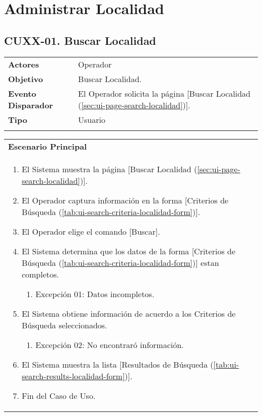 \clearpage
\section{Administrar Localidad} \label{sec:cf-uc-admin-localidad}

\subsection{CUXX-01. Buscar Localidad} \label{sec:cu-search-Localidad}

\begin{tabular}{ p{3.5cm} p{11.5cm} }
	\textbf{Actores} & Operador\\
	\textbf{Objetivo} & Buscar Localidad.\\
	\textbf{Evento Disparador} & El Operador solicita la página [Buscar Localidad (\ref{sec:ui-page-search-localidad})].\\
	\textbf{Tipo} & Usuario\\
	\\
\end{tabular}

\begin{tabular}{ p{15.5cm} }
	\textbf{Escenario Principal} \\
	\begin{enumerate}
		\item El Sistema muestra la página [Buscar Localidad (\ref{sec:ui-page-search-localidad})].
		\item El Operador captura información en la forma [Criterios de Búsqueda (\ref{tab:ui-search-criteria-localidad-form})].
		\item El Operador elige el comando [Buscar].
		\item El Sistema determina que los datos de la forma [Criterios de Búsqueda (\ref{tab:ui-search-criteria-localidad-form})] estan completos.
			\begin{enumerate}
				\item Excepción 01: Datos incompletos.
			\end{enumerate}
		\item El Sistema obtiene información de acuerdo a los Criterios de Búsqueda seleccionados.
			\begin{enumerate}
				\item Excepción 02: No encontraró información.
			\end{enumerate}
		\item El Sistema muestra la lista [Resultados de Búsqueda (\ref{tab:ui-search-results-localidad-form})].
		\item Fin del Caso de Uso.
	\end{enumerate}
\end{tabular}

